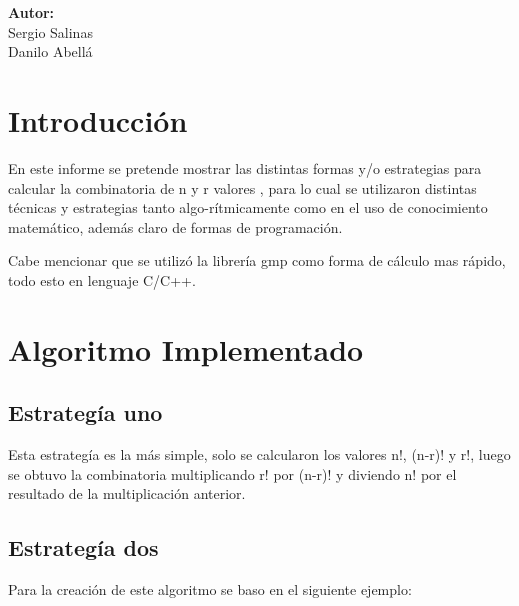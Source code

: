 \documentclass[12pt,letterpaper]{scrartcl}
\begin{document}
\begin{titlepage}
\begin{center}
\begin{minipage}[l]{0.4\textwidth}
	\begin{flushright}

		\textbf{\textsf{Autor:}}\\
		\linespread{1}
		\large Sergio Salinas\\
		\large Danilo Abellá\\

	\end{flushright}
\end{minipage}

\end{center}

\end{titlepage}


\tableofcontents

\newpage
\section*{Introducción}

En este informe se pretende mostrar las distintas formas y/o estrategias para calcular la combinatoria de n y r valores , para lo cual se utilizaron distintas técnicas y estrategias tanto algo-rítmicamente como en el uso de conocimiento matemático, además claro de formas de programación.

Cabe mencionar que se utilizó la librería gmp como forma de cálculo mas rápido, todo esto en lenguaje C/C++.

\newpage

\section{Algoritmo Implementado}

\subsection{Estrategía uno}

Esta estrategía es la más simple, solo se calcularon los valores n!, (n-r)! y r!, luego  se obtuvo la combinatoria multiplicando r! por (n-r)! y diviendo n! por el resultado de la multiplicación anterior.

\subsection{Estrategía dos}

Para la creación de este algoritmo se baso en el siguiente ejemplo:
\end{document}
